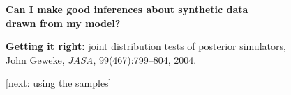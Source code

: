 \documentclass[25pt,landscape]{foils}
\newcommand{\Gray}{\textcolor{mygray}}
\newcommand{\Green}{\textcolor{mypine}}
\newcommand{\myfoilhead}[1]{
\newpage
\vspace*{-1cm}
\Gray{
\begin{tabular*}{\textwidth}{l}
{\bf \Huge #1} \\
\bottomrule
\end{tabular*}}}
\newcommand{\myindent}[1]{
\hspace*{0.1\linewidth}\begin{minipage}{0.89\linewidth}
    #1
\end{minipage}}
\newcommand{\Z}{\mathcal{Z}}
\begin{document}
\vspace*{3cm}

\Green{\large \bf Can I make good inferences about synthetic data\\[0.1in]
drawn from my model?}

\vspace*{2cm}

\bigskip

\textbf{Getting it right:} joint distribution tests of posterior simulators,\\
John Geweke, \textit{JASA}, 99(467):799--804, 2004.

\vfill
\begin{flushright}
    \Gray{\tiny [next: using the samples]}
\end{flushright}
% 
% 
% 
% 
% 
% 
% 
% 
% 
% 
% 

% 
% 
% 
% 

\end{document}
